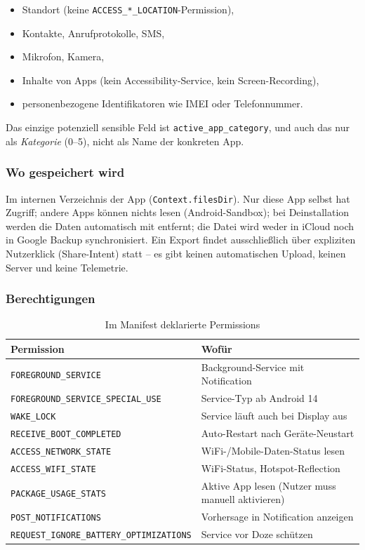 \documentclass[12pt, a4paper, ngerman]{article}
\newcommand{\code}[1]{\texttt{#1}}
\begin{document}
\begin{itemize}
\item Standort (keine \code{ACCESS\_*\_LOCATION}-Permission),
\item Kontakte, Anrufprotokolle, SMS,
\item Mikrofon, Kamera,
\item Inhalte von Apps (kein Accessibility-Service, kein
  Screen-Recording),
\item personenbezogene Identifikatoren wie IMEI oder Telefonnummer.
\end{itemize}

Das einzige potenziell sensible Feld ist
\code{active\_app\_category}, und auch das nur als \emph{Kategorie}
(0--5), nicht als Name der konkreten App.

\subsubsection*{Wo gespeichert wird}

Im internen Verzeichnis der App (\code{Context.filesDir}). Nur
diese App selbst hat Zugriff; andere Apps können nichts lesen
(Android-Sandbox); bei Deinstallation werden die Daten automatisch
mit entfernt; die Datei wird weder in iCloud noch in Google Backup
synchronisiert. Ein Export findet ausschließlich über expliziten
Nutzerklick (Share-Intent) statt -- es gibt keinen automatischen
Upload, keinen Server und keine Telemetrie.

\subsubsection*{Berechtigungen}

\begin{table}[H]
\centering
\caption{Im Manifest deklarierte Permissions}
\label{tab:permissions}
\small
\begin{tabular}{lp{8.5cm}}
\toprule
\textbf{Permission} & \textbf{Wofür} \\
\midrule
\code{FOREGROUND\_SERVICE} & Background-Service mit Notification \\
\code{FOREGROUND\_SERVICE\_SPECIAL\_USE} & Service-Typ ab Android 14 \\
\code{WAKE\_LOCK} & Service läuft auch bei Display aus \\
\code{RECEIVE\_BOOT\_COMPLETED} & Auto-Restart nach Geräte-Neustart \\
\code{ACCESS\_NETWORK\_STATE} & WiFi-/Mobile-Daten-Status lesen \\
\code{ACCESS\_WIFI\_STATE} & WiFi-Status, Hotspot-Reflection \\
\code{PACKAGE\_USAGE\_STATS} & Aktive App lesen (Nutzer muss manuell aktivieren) \\
\code{POST\_NOTIFICATIONS} & Vorhersage in Notification anzeigen \\
\code{REQUEST\_IGNORE\_BATTERY\_OPTIMIZATIONS} & Service vor Doze schützen \\
\bottomrule
\end{tabular}
\end{table}
\end{document}
